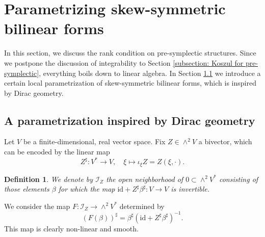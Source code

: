 \documentclass[11pt,thmsa]{amsart}
\newtheorem{definition}[theorem]{Definition}
\theoremstyle{definition}
\newcommand{\id}{\mathrm{id}}
\begin{document}
 
\section{\textsf{Parametrizing skew-symmetric bilinear forms}}\label{section: linear algebra}

In this section, we discuss the rank condition on pre-symplectic structures.
 Since we postpone the discussion of integrability
to Section \ref{subsection: Koszul for pre-symplectic}, everything boils down
to linear algebra.
In Section \ref{subsection: Dirac parametrization} we introduce a certain local parametrization of skew-symmetric bilinear forms,
which is inspired by Dirac geometry. 
 
\subsection{A parametrization inspired by Dirac geometry}\label{subsection: Dirac parametrization}

 
Let $V$ be a finite-dimensional, real vector space. Fix $Z\in \wedge^2 V$ a bivector, which can be encoded by the linear map  $$Z^\sharp\colon V^* \to V, \quad \xi \mapsto \iota_\xi Z = Z(\xi,\cdot).$$

\begin{definition}
We denote by $\mathcal{I}_Z$ the open neighborhood of
$0 \subset \wedge^2 V^*$ consisting of those elements $\beta$
for which the map $\mathrm{id} + Z^\sharp \beta^\sharp\colon V\to V$ is invertible.
\end{definition}

We consider the map  $F \colon \mathcal{I}_Z\to \wedge^2 V^*$ determined by 
\begin{equation}\label{eq:alphabeta}
(F (\beta))^\sharp = \beta^\sharp(\id + Z^{\sharp}\beta^\sharp)^{-1}.
\end{equation}
This map is clearly non-linear and smooth.
\end{document}
